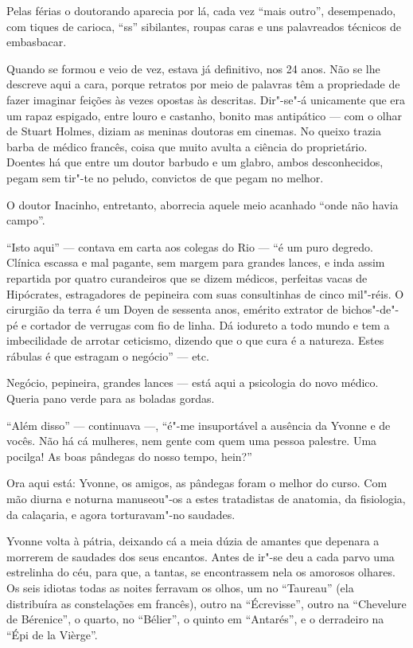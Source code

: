 Pelas férias o doutorando aparecia por lá, cada vez ``mais outro'',
desempenado, com tiques de carioca, ``ss'' sibilantes, roupas caras e
uns palavreados técnicos de embasbacar.

Quando se formou e veio de vez, estava já definitivo, nos 24 anos. Não
se lhe descreve aqui a cara, porque retratos por meio de palavras têm a
propriedade de fazer imaginar feições às vezes opostas às descritas.
Dir"-se"-á unicamente que era um rapaz espigado, entre louro e castanho,
bonito mas antipático --- com o olhar de Stuart Holmes, diziam as
meninas doutoras em cinemas. No queixo trazia barba de médico francês,
coisa que muito avulta a ciência do proprietário. Doentes há que entre
um doutor barbudo e um glabro, ambos desconhecidos, pegam sem tir"-te no
peludo, convictos de que pegam no melhor.

O doutor Inacinho, entretanto, aborrecia aquele meio acanhado ``onde não
havia campo''.

``Isto aqui'' --- contava em carta aos colegas do Rio --- ``é um puro
degredo. Clínica escassa e mal pagante, sem margem para grandes lances,
e inda assim repartida por quatro curandeiros que se dizem médicos,
perfeitas vacas de Hipócrates, estragadores de pepineira com suas
consultinhas de cinco mil"-réis. O cirurgião da terra é um Doyen de
sessenta anos, emérito extrator de bichos"-de"-pé e cortador de verrugas
com fio de linha. Dá iodureto a todo mundo e tem a imbecilidade de
arrotar ceticismo, dizendo que o que cura é a natureza. Estes rábulas é
que estragam o negócio'' --- etc.

Negócio, pepineira, grandes lances --- está aqui a psicologia do novo
médico. Queria pano verde para as boladas gordas.

``Além disso'' --- continuava ---, ``é"-me insuportável a ausência da
Yvonne e de vocês. Não há cá mulheres, nem gente com quem uma pessoa
palestre. Uma pocilga! As boas pândegas do nosso tempo, hein?''

Ora aqui está: Yvonne, os amigos, as pândegas foram o melhor do curso.
Com mão diurna e noturna manuseou"-os a estes tratadistas de anatomia, da
fisiologia, da calaçaria, e agora torturavam"-no saudades.

Yvonne volta à pátria, deixando cá a meia dúzia de amantes que depenara
a morrerem de saudades dos seus encantos. Antes de ir"-se deu a cada
parvo uma estrelinha do céu, para que, a tantas, se encontrassem nela os
amorosos olhares. Os seis idiotas todas as noites ferravam os olhos, um
no ``Taureau'' (ela distribuíra as constelações em francês), outro na
``Écrevisse'', outro na ``Chevelure de Bérenice'', o quarto, no
``Bélier'', o quinto em ``Antarés'', e o derradeiro na ``Épi de la
Vièrge''.

